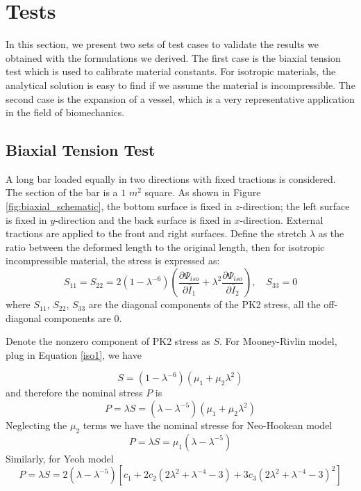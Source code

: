 \section{Tests}
In this section, we present two sets of test cases to validate the results we obtained with the formulations we derived. The first case is the biaxial tension test which is used to calibrate material constants. For isotropic materials, the analytical solution is easy to find if we assume the material is incompressible. The second case is the expansion of a vessel, which is a very representative application in the field of biomechanics.  

\subsection{Biaxial Tension Test}
\label{biaxial_tension_test}
A long bar loaded equally in two directions with fixed tractions is considered. The section of the bar is a $1$ $m^2$ square. As shown in Figure \ref{fig:biaxial_schematic}, the bottom surface is fixed in $z$-direction; the left surface is fixed in $y$-direction and the back surface is fixed in $x$-direction. External tractions are applied to the front and right surfaces. Define the stretch $\lambda$ as the ratio between the deformed length to the original length, then for isotropic incompressible material, the stress is expressed as:
\begin{equation}
S_{11} = S_{22} = 2(1 - {\lambda}^{-6})(\frac{\partial\Psi_{iso}}{\partial\bar{I}_1} + {\lambda}^2\frac{\partial\Psi_{iso}}{\partial\bar{I}_2}), \quad S_{33} = 0
\end{equation}
where $S_{11}$, $S_{22}$, $S_{33}$ are the diagonal components of the PK2 stress, all the off-diagonal components are $0$.

Denote the nonzero component of PK2 stress as $S$. For Mooney-Rivlin model, plug in Equation \ref{iso1}, we have

\begin{equation}
S = (1 - {\lambda}^{-6})(\mu_1 + \mu_2{\lambda}^2)
\end{equation}
and therefore the nominal stress $P$ is
\begin{equation}
P = \lambda S =  (\lambda - {\lambda}^{-5})(\mu_1 + \mu_2{\lambda}^2)
\end{equation}
Neglecting the $\mu_2$ terms we have the nominal stresse for Neo-Hookean model
\begin{equation}
P = \lambda S =  \mu_1(\lambda - {\lambda}^{-5})
\end{equation}
Similarly, for Yeoh model
\begin{equation}
P = \lambda S = 2(\lambda - {\lambda}^{-5})[c_1 + 2c_2(2{\lambda}^2 + {\lambda}^{-4} - 3) + 3c_3(2{\lambda}^2 + {\lambda}^{-4} - 3)^2]
\end{equation}

